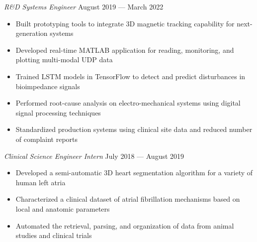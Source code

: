 \documentclass{article}
\begin{document}
\textit{R\&D Systems Engineer} \hfill August 2019 --- March 2022\\
\vspace{-2mm}
\begin{itemize} \itemsep 0.05pt
	\item Built prototyping tools to integrate 3D magnetic tracking capability for next-generation systems
	\item Developed real-time MATLAB application for reading, monitoring, and plotting multi-modal UDP data
	\item Trained LSTM models in TensorFlow to detect and predict disturbances in bioimpedance signals
	\item Performed root-cause analysis on electro-mechanical systems using digital signal processing techniques
	\item Standardized production systems using clinical site data and reduced number of complaint reports
\end{itemize}

\textit{Clinical Science Engineer Intern} \hfill July 2018 --- August 2019\\
\vspace{-2mm}
\begin{itemize} \itemsep 0.05pt
	\item Developed a semi-automatic 3D heart segmentation algorithm for a variety of human left atria
	\item Characterized a clinical dataset of atrial fibrillation mechanisms based on local and anatomic parameters
	\item Automated the retrieval, parsing, and organization of data from animal studies and clinical trials
\end{itemize}

\end{document}
